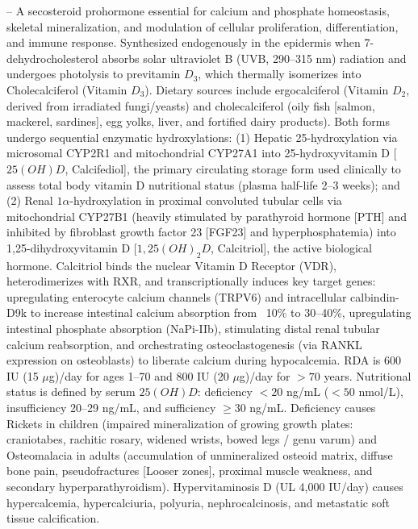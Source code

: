 -- A secosteroid prohormone essential for calcium and phosphate homeostasis, skeletal mineralization, and modulation of cellular proliferation, differentiation, and immune response. Synthesized endogenously in the epidermis when 7-dehydrocholesterol absorbs solar ultraviolet B (UVB, 290--315 nm) radiation and undergoes photolysis to previtamin $D_3$, which thermally isomerizes into Cholecalciferol (Vitamin $D_3$). Dietary sources include ergocalciferol (Vitamin $D_2$, derived from irradiated fungi/yeasts) and cholecalciferol (oily fish [salmon, mackerel, sardines], egg yolks, liver, and fortified dairy products). Both forms undergo sequential enzymatic hydroxylations: (1) Hepatic 25-hydroxylation via microsomal CYP2R1 and mitochondrial CYP27A1 into 25-hydroxyvitamin D [$25(OH)D$, Calcifediol], the primary circulating storage form used clinically to assess total body vitamin D nutritional status (plasma half-life 2--3 weeks); and (2) Renal $1\alpha$-hydroxylation in proximal convoluted tubular cells via mitochondrial CYP27B1 (heavily stimulated by parathyroid hormone [PTH] and inhibited by fibroblast growth factor 23 [FGF23] and hyperphosphatemia) into 1,25-dihydroxyvitamin D [$1,25(OH)_2D$, Calcitriol], the active biological hormone. Calcitriol binds the nuclear Vitamin D Receptor (VDR), heterodimerizes with RXR, and transcriptionally induces key target genes: upregulating enterocyte calcium channels (TRPV6) and intracellular calbindin-D9k to increase intestinal calcium absorption from ~10\% to 30--40\%, upregulating intestinal phosphate absorption (NaPi-IIb), stimulating distal renal tubular calcium reabsorption, and orchestrating osteoclastogenesis (via RANKL expression on osteoblasts) to liberate calcium during hypocalcemia. RDA is 600 IU (15 $\mu$g)/day for ages 1--70 and 800 IU (20 $\mu$g)/day for $>70$ years. Nutritional status is defined by serum $25(OH)D$: deficiency $<20$ ng/mL ($<50$ nmol/L), insufficiency 20--29 ng/mL, and sufficiency $\ge 30$ ng/mL. Deficiency causes Rickets in children (impaired mineralization of growing growth plates: craniotabes, rachitic rosary, widened wrists, bowed legs / genu varum) and Osteomalacia in adults (accumulation of unmineralized osteoid matrix, diffuse bone pain, pseudofractures [Looser zones], proximal muscle weakness, and secondary hyperparathyroidism). Hypervitaminosis D (UL 4,000 IU/day) causes hypercalcemia, hypercalciuria, polyuria, nephrocalcinosis, and metastatic soft tissue calcification.

